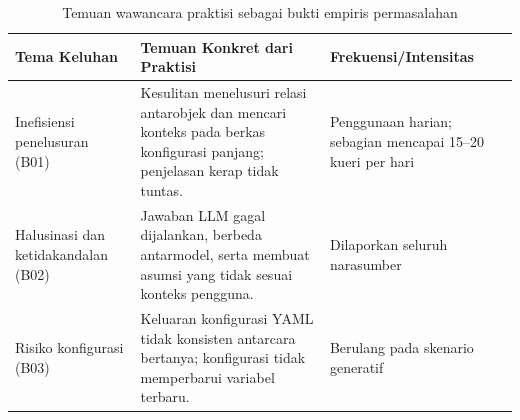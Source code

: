 ﻿\renewcommand{\arraystretch}{1.3}
\captionsetup[table]{justification=raggedright,singlelinecheck=false}
\begin{table}[H]
\caption{Temuan wawancara praktisi sebagai bukti empiris permasalahan}
\label{tbl:bukti_wawancara}
\centering
\begin{tabular}{| p{} | p{} | p{} |}
\hline
\textbf{Tema Keluhan} & \textbf{Temuan Konkret dari Praktisi} & \textbf{Frekuensi/Intensitas} \\
\hline
Inefisiensi penelusuran (B01) &
Kesulitan menelusuri relasi antarobjek dan mencari konteks pada berkas konfigurasi panjang; penjelasan kerap tidak tuntas. &
Penggunaan harian; sebagian mencapai 15--20 kueri per hari \\
\hline
Halusinasi dan ketidakandalan (B02) &
Jawaban LLM gagal dijalankan, berbeda antarmodel, serta membuat asumsi yang tidak sesuai konteks pengguna. &
Dilaporkan seluruh narasumber \\
\hline
Risiko konfigurasi (B03) &
Keluaran konfigurasi YAML tidak konsisten antarcara bertanya; konfigurasi tidak memperbarui variabel terbaru. &
Berulang pada skenario generatif \\
\hline
\end{tabular}
\end{table}
